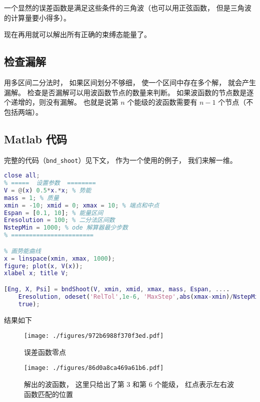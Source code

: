 一个显然的误差函数是满足这些条件的三角波（也可以用正弦函数， 但是三角波的计算量要小得多）。

现在再用就可以解出所有正确的束缚态能量了。

\subsection{检查漏解}
用多区间二分法时， 如果区间划分不够细， 使一个区间中存在多个解， 就会产生漏解。 检查是否漏解可以用波函数节点的数量来判断。 如果波函数的节点数是逐个递增的，则没有漏解。 也就是说第 $n$ 个能级的波函数需要有 $n - 1$ 个节点（不包括两端）。

\subsection{Matlab 代码}

完整的代码（\verb`bnd_shoot`）见下文， 作为一个使用的例子， 我们来解一维。

\begin{lstlisting}[language=matlab, caption=bndShootDemo.m]
close all;
% =====  设置参数  ========
V = @(x) 0.5*x.*x; % 势能
mass = 1; % 质量
xmin = -10; xmid = 0; xmax = 10; % 端点和中点
Espan = [0.1, 10]; % 能量区间
Eresolution = 100; % 二分法区间数
NstepMin = 1000; % ode 解算器最少步数
% =======================

% 画势能曲线
x = linspace(xmin, xmax, 1000);
figure; plot(x, V(x));
xlabel x; title V;

[Eng, X, Psi] = bndShoot(V, xmin, xmid, xmax, mass, Espan, ....
    Eresolution, odeset('RelTol',1e-6, 'MaxStep',abs(xmax-xmin)/NstepMin),...
    true);
\end{lstlisting}

结果如下
\begin{figure}[ht]
\centering
\texttt{[image: ./figures/972b6988f370f3ed.pdf]}
\caption{误差函数零点} \label{fig_BndSho_1}
\end{figure}

\begin{figure}[ht]
\centering
\texttt{[image: ./figures/86d0a8ca469a61b6.pdf]}
\caption{解出的波函数， 这里只给出了第 3 和第 6 个能级， 红点表示左右波函数匹配的位置} \label{fig_BndSho_2}
\end{figure}

